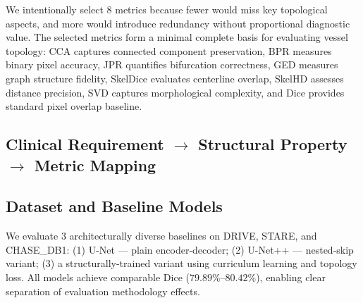 \documentclass[conference]{IEEEtran}
\begin{document}
We intentionally select 8 metrics because fewer would miss key topological aspects, and more would introduce redundancy without proportional diagnostic value. The selected metrics form a minimal complete basis for evaluating vessel topology: CCA captures connected component preservation, BPR measures binary pixel accuracy, JPR quantifies bifurcation correctness, GED measures graph structure fidelity, SkelDice evaluates centerline overlap, SkelHD assesses distance precision, SVD captures morphological complexity, and Dice provides standard pixel overlap baseline.

\subsection{Clinical Requirement $\rightarrow$ Structural Property $\rightarrow$ Metric Mapping}

\begin{table}[htbp]
\caption{Clinical to Mathematical Design Principles of the Evaluation Protocol}
\label{tab:design_principles}
\centering
{}
\end{table}

\subsection{Dataset and Baseline Models}
We evaluate 3 architecturally diverse baselines on DRIVE, STARE, and CHASE\_DB1: (1) U-Net — plain encoder-decoder; (2) U-Net++ — nested-skip variant; (3) a structurally-trained variant using curriculum learning and topology loss. All models achieve comparable Dice ($79.89\%$--$80.42\%$), enabling clear separation of evaluation methodology effects.
\end{document}
